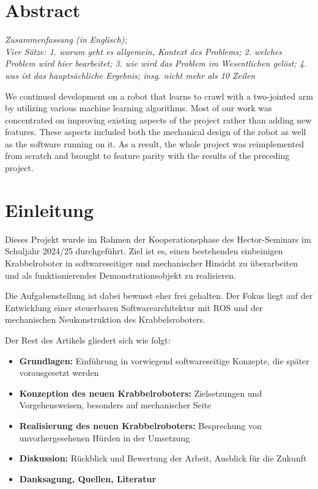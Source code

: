 \section*{Abstract}

\textit{Zusammenfassung (in Englisch); \\ Vier Sätze: 1. worum geht es allgemein, Kontext des Problems; 2. welches Problem wird hier bearbeitet; 3. wie wird das Problem im Wesentlichen gelöst; 4. was ist das hauptsächliche Ergebnis; insg. nicht mehr als 10 Zeilen}

We continued development on a robot that learns to crawl with a two-jointed arm by utilizing various machine learning algorithms. Most of our work was concentrated on improving existing aspects of the project rather than adding new features. These aspects included both the mechanical design of the robot as well as the software running on it. As a result, the whole project was reimplemented from scratch and brought to feature parity with the results of the preceding project.

\section{Einleitung}

Dieses Projekt wurde im Rahmen der Kooperationsphase des Hector-Seminars im Schuljahr 2024/25 durchgeführt. 
Ziel ist es, einen bestehenden einbeinigen Krabbelroboter in softwareseitiger und mechanischer Hinsicht zu überarbeiten und als funktionierendes Demonstrationsobjekt zu realisieren.

Die Aufgabenstellung ist dabei bewusst eher frei gehalten. Der Fokus liegt auf der Entwicklung einer steuerbaren Softwarearchitektur mit ROS und der mechanischen Neukonstruktion des Krabbelsroboters.

Der Rest des Artikels gliedert sich wie folgt:

\begin{itemize}
	\item \textbf{Grundlagen:} Einführung in vorwiegend softwareseitige Konzepte, die später vorausgesetzt werden
	\item \textbf{Konzeption des neuen Krabbelroboters:} Zielsetzungen und Vorgehensweisen, besonders auf mechanischer Seite
	\item \textbf{Realisierung des neuen Krabbelroboters:} Besprechung von unvorhergesehenen Hürden in der Umsetzung
	\item \textbf{Diskussion:} Rückblick und Bewertung der Arbeit, Ausblick für die Zukunft
	\item \textbf{Danksagung, Quellen, Literatur}
\end{itemize}
